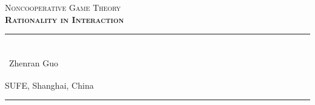 
\begin{titlepage}
    \colorbox{black!5}{%
        \parbox[t]{0.975\textwidth}{%
            \parbox[t]{0.95\textwidth}{%
                \raggedleft\vspace{0.75cm}\Huge\scshape
                Noncooperative Game Theory \\[7.5pt]
                \large\bfseries Rationality in Interaction
                \vspace{0.75cm}%
            }%
        }%
    }%

    \vfill

    \parbox[t]{0.95\textwidth}{%
        \hfill\rule{0.15\linewidth}{0.5pt}\\[7.5pt]
        \raggedleft
        \textcopyright\ Zhenran Guo\textsuperscript{\textdagger}%
        
        \normalsize\textsuperscript{\textdagger} SUFE, Shanghai, China\\[10pt]
        
        \hfill\rule{0.15\linewidth}{0.5pt}%
    }%
\end{titlepage}
